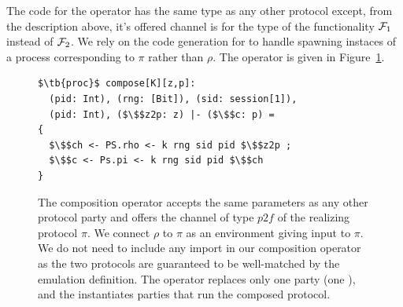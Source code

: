 The code for the operator has the same type as any other protocol except, from the description above, it's offered channel is for the type of the functionality $\mathcal{F}_1$ instead of $\mathcal{F}_2$.
We rely on the code generation for to handle spawning instaces of a  process corresponding to $\pi$ rather than $\rho$.
The operator is given in Figure~\ref{lst:compose}.
\begin{figure}
\begin{lstlisting}[basicstyle=\footnotesize\BeraMonottFamily, frame=single, mathescape]
$\tb{proc}$ compose[K][z,p]:
  (pid: Int), (rng: [Bit]), (sid: session[1]),
  (pid: Int), ($\$$z2p: z) |- ($\$$c: p) =
{
  $\$$ch <- PS.rho <- k rng sid pid $\$$z2p ;
  $\$$c <- Ps.pi <- k rng sid pid $\$$ch 
}
\end{lstlisting}
\caption{The composition operator accepts the same parameters as any other protocol party and offers the channel of type $p2f$ of the realizing protocol $\pi$. We connect $\rho$ to $\pi$ as an environment giving input to $\pi$. We do not need to include any import in our composition operator as the two protocols are guaranteed to be well-matched by the emulation definition. The operator replaces only one party (one ), and the \partywrapper instantiates parties that run the composed protocol.}
\label{lst:compose}
\end{figure}

